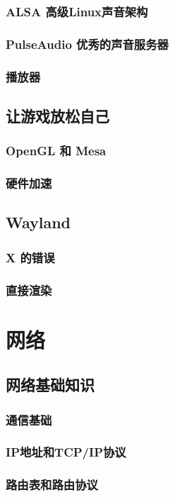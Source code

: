 \documentclass[amstex,twoside]{ctexbook}
\begin{document}
\subsection{ ALSA 高级Linux声音架构}
\subsection{  PulseAudio 优秀的声音服务器	}
\subsection{  播放器	}
\section{  让游戏放松自己	}
\subsection{  OpenGL 和 Mesa	}
\subsection{  硬件加速	}
\section{  Wayland	}
\subsection{ X 的错误	}
\subsection{  直接渲染}

\chapter{网络}
\section{  网络基础知识}
\subsection{  通信基础}
\subsection{  IP地址和TCP/IP协议}
\subsection{  路由表和路由协议}
\end{document}
